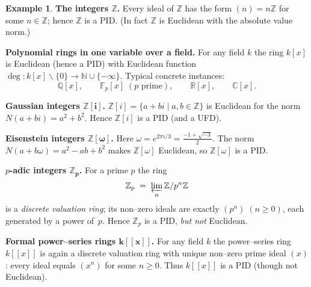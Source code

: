 \documentclass[12pt]{article}
\theoremstyle{definition} %
\newtheorem{example}{Example}
\theoremstyle{plain} %
\begin{document}
\begin{example}
  \item \textbf{The integers \(\boldsymbol{\mathbb{Z}}\).}  
        Every ideal of \(\mathbb{Z}\) has the form 
        \((n)\!=\!n\mathbb{Z}\) for some \(n\in\mathbb{Z}\); hence \(\mathbb{Z}\) is a PID.  
        (In fact \(\mathbb{Z}\) is Euclidean with the absolute value norm.)
  
  \item \textbf{Polynomial rings in one variable over a field.}  
        For any field \(k\) the ring \(k[x]\) is Euclidean 
        (hence a PID) with Euclidean function
        \(\deg\colon k[x]\smallsetminus\{0\}\to\mathbb{N}\cup\{-\infty\}\).  
        Typical concrete instances:
        \[
           \mathbb{Q}[x],\qquad
           \mathbb{F}_{p}[x]\;(p\text{ prime}),\qquad
           \mathbb{R}[x],\qquad
           \mathbb{C}[x].
        \]
  
  \item \textbf{Gaussian integers \(\boldsymbol{\mathbb{Z}[i]}\).}  
        \(\mathbb{Z}[i]=\{a+bi\mid a,b\in\mathbb{Z}\}\) is Euclidean
        for the norm \(N(a+bi)=a^{2}+b^{2}\).  
        Hence \(\mathbb{Z}[i]\) is a PID (and a UFD).
  
  \item \textbf{Eisenstein integers \(\boldsymbol{\mathbb{Z}[\omega]}\).}  
        Here \(\omega=e^{2\pi i/3}=\tfrac{-1+\sqrt{-3}}{2}\).
        The norm \(N(a+b\omega)=a^{2}-ab+b^{2}\) makes \(\mathbb{Z}[\omega]\)
        Euclidean, so \(\mathbb{Z}[\omega]\) is a PID.
  
  \item \textbf{\(p\)-adic integers \(\boldsymbol{\mathbb{Z}_{p}}\).}  
        For a prime \(p\) the ring
        \[
           \mathbb{Z}_{p}\;=\;\varprojlim_{n}\mathbb{Z}/p^{n}\mathbb{Z}
        \]
        is a \emph{discrete valuation ring};
        its non–zero ideals are exactly \((p^{n})\;(n\ge0)\),
        each generated by a power of~\(p\).  
        Hence \(\mathbb{Z}_{p}\) is a PID, \emph{but not} Euclidean.
  
  \item \textbf{Formal power–series rings \(\boldsymbol{k[[x]]}\).}  
        For any field \(k\) the power–series ring
        \(k[[x]]\) is again a discrete valuation ring
        with unique non–zero prime ideal \((x)\):
        every ideal equals \((x^{n})\) for some \(n\ge0\).  
        Thus \(k[[x]]\) is a PID (though not Euclidean).
  

\end{example}
\end{document}

